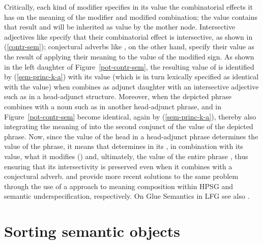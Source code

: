 \documentclass[output=paper
 	        ,biblatex
                ,babelshorthands
                ,newtxmath
                ,draftmode
                ,colorlinks, citecolor=brown
]{langscibook}
\begin{document}
Critically, each kind of modifier specifies in its  value the combinatorial
effects it has on the meaning of the modifier and modified combination; the  value
contains that result and will be inherited as  value by the mother node. Intersective
adjectives like  specify that their combinatorial effect is intersective, as
shown in (\ref{contr-sem}); conjectural adverbs like , on the other hand, specify
their  value as the result of applying their meaning to the  value of the
modified sign. As shown in the left daughter of Figure~\ref{pot-contr-sem}, the resulting
 value of  is identified by (\ref{sem-princ-k-a}) with its
 value (which is in turn lexically specified as identical with the 
value) when  combines as adjunct daughter with an intersective adjective such as
 in a head-adjunct structure. Moreover, when the depicted phrase
 combines with a noun such as  in another head-adjunct
phrase,  and  in Figure~\ref{pot-contr-sem} become identical, again by
(\ref{sem-princ-k-a}), thereby also integrating the meaning of  into
the second conjunct of the  value of the depicted phrase. Now, since the
 value of the head in a head-adjunct phrase determines the  value of the
phrase, it means that  determines in its , in combination with its
 value, what it modifies () and, ultimately, the  value of the
entire phrase , thus ensuring that its intersectivity is
preserved even when it combines with a conjectural adverb. \citet{AsudehandCrouch2002} and
\citet{Egg2004a} provide more recent solutions to the same problem through the use of a  approach to meaning composition within HPSG and semantic underspecification,
respectively. On Glue Semantics in LFG see also .

\section{Sorting semantic objects}
\end{document}
